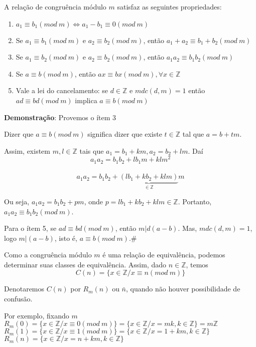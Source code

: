 \begin{teorema} A relação de congruência módulo $m$ satisfaz as seguintes propriedades:
\begin{enumerate}
\item $a_{1}\equiv b_{1}(mod\ m)\Leftrightarrow a_{1}-b_{1}\equiv 0(mod\ m)$
\item Se $a_{1}\equiv b_{1}(mod\ m)$ e $a_{2}\equiv b_{2}(mod\ m)$, então $a_{1}+a_{2}\equiv b_{1}+b_{2}(mod\ m)$
\item Se $a_{1}\equiv b_{2}(mod\ m)$ e $a_{2}\equiv b_{2}(mod\ m)$, então $a_{1}a_{2}\equiv b_{1}b_{2}(mod\ m)$
\item Se $a\equiv b(mod\ m)$, então $ax\equiv bx(mod\ m), \forall x\in\mathbb{Z}$
\item Vale a lei do cancelamento: se $d\in\mathbb{Z}$ e $mdc(d,m)=1$ então\\ $ad\equiv bd(mod\ m)$ implica $a\equiv b(mod\ m)$

\end{enumerate}
\end{teorema}

\textbf{Demonstração}: Provemos o ítem 3

Dizer que $a\equiv b(mod\ m)$ significa dizer que existe $t\in\mathbb{Z}$ tal que $a=b+tm$.

Assim, existem $m,l\in\mathbb{Z}$ tais que $a_{1}=b_{1}+km, a_{2}=b_{2}+lm$. Daí\\
\[a_{1}a_{2}=b_{1}b_{2}+lb_{1}m+klm^{2}\]\\
\[a_{1}a_{2}=b_{1}b_{2}+\underbrace{(lb_{1}+kb_{2}+klm)}_{\in\mathbb{Z}}m\]

Ou seja, $a_{1}a_{2}=b_{1}b_{2}+pm$, onde $p=lb_{1}+kb_{2}+klm\in\mathbb{Z}$. Portanto, $a_{1}a_{2}\equiv b_{1}b_{2}(mod\ m)$.

Para o ítem 5, se $ad\equiv bd(mod\ m)$, então $m|d(a-b)$. Mas, $mdc(d,m)=1$, logo $m|(a-b)$, isto é, $a\equiv b(mod\ m)$.\#

Como a congruência módulo $m$ é uma relação de equivalência, podemos determinar suas classes de equivalência. Assim, dado $n\in\mathbb{Z}$, temos
\[C(n)=\{x\in\mathbb{Z}/x\equiv n(mod\ m)\}\]

Denotaremos $C(n)$ por $R_{m}(n)$ ou $\bar{n}$, quando não houver possibilidade de confusão.

Por exemplo, fixando $m$\\
$R_{m}(0)=\{x\in\mathbb{Z}/x\equiv 0(mod\ m)\}=\{x\in \mathbb{Z}/x=mk, k\in\mathbb{Z}\}=m\mathbb{Z}$\\
$R_{m}(1)=\{x\in\mathbb{Z}/x\equiv 1(mod\ m)\}=\{x\in\mathbb{Z}/x=1+km, k\in\mathbb{Z}\}$\\
$R_{m}(n)=\{x\in\mathbb{Z}/x=n+km, k\in\mathbb{Z}\}$

